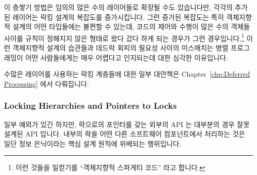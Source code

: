 이 층쌓기 방법은 임의의 많은 수의 레이어들로 확장될 수도 있습니다만, 각각의
추가된 레이어는 락킹 설계의 복잡도를 증가시킵니다.
그런 증가된 복잡도는 특히 객체지향적 설계의 어떤 타입들에는 불편할 수 있는데,
코드의 제어와 수행이 많은 수의 객체들 사이를 규칙이 정해지지 않은 형태로 왔다
갔다 하게 되는 경우가 그런 경우입니다.\footnote{
	이런 것들을 일컫기를 ``객체지향적 스파게티 코드'' 라고 합니다.}
이런 객체지향적 설계의 습관들과 데드락 회피의 필요성 사이의 미스매치는 병렬
프로그래밍이 어떤 사람들에게는 매우 어렵다고 인지되는데 대한 심각한 이유입니다.

수많은 레이어를 사용하는 락킹 계층들에 대한 일부 대안책은
Chapter~\ref{chp:Deferred Processing} 에서 다뤄집니다.

\subsubsection{Locking Hierarchies and Pointers to Locks}
\label{sec:locking:Locking Hierarchies and Pointers to Locks}

일부 예외가 있긴 하지만, 락으로의 포인터를 갖는 외부의 API 는 대부분의 경우
잘못 설계된 API 입니다.
내부의 락을 어떤 다른 소프트웨어 컴포넌트에서 처리하는 것은 일단 정보
은닉이라는 핵심 설계 원칙에 위배되는 행위입니다.

